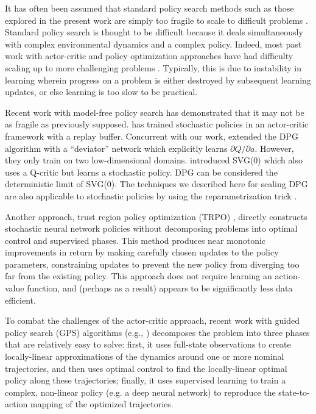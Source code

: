 \documentclass{article} %
\begin{document}
It has often been assumed that standard policy search methods such as
those explored in the present work are simply too fragile to scale to
difficult problems \citep{levine2015end}.  Standard policy search is
thought to be difficult because it deals simultaneously with complex
environmental dynamics and a complex policy.
Indeed,
most past work with actor-critic and policy optimization
approaches have had difficulty scaling up to more
challenging problems \citep{deisenroth2013survey}.
Typically, this is due to instability in
learning wherein progress on a problem is either destroyed by subsequent
learning updates, or else learning is too slow to be practical.

Recent work with model-free policy search has
demonstrated that it may not be as fragile as previously supposed.
\citet{wawrzynski2009real, wawrzynski2013autonomous} has
trained stochastic policies in an actor-critic framework
with a replay buffer.
Concurrent with our work, \citet{balduzzi2015compatible} extended the DPG
algorithm with a ``deviator'' network which explicitly learns
$\partial Q/\partial a$. However, they only train on two low-dimensional domains.
\citet{heess2015learning} introduced SVG(0) which also uses
a Q-critic but learns a stochastic policy.
DPG can be considered the deterministic limit of SVG(0). The techniques we
described here for scaling DPG are also applicable to stochastic policies by
using the reparametrization trick \citep{heessRDPG2015,schulman2015gradient}.

Another approach, trust region policy
optimization (TRPO) \citep{schulman2015trust}, directly constructs
stochastic neural network policies without decomposing problems into
optimal control and supervised phases.  This method produces near
monotonic improvements in return by making carefully chosen updates to
the policy parameters, constraining updates to prevent the new policy
from diverging too far from the existing policy.  This approach does
not require learning an action-value function, and (perhaps as a
result) appears to be significantly less data efficient.


To combat the challenges of the actor-critic approach, recent work
with guided policy search (GPS) algorithms (e.g.,
\citep{levine2015end}) decomposes the problem into three phases that are
relatively easy to solve: first, it uses full-state observations to
create locally-linear approximations of the dynamics around one or
more nominal trajectories, and then uses optimal control to find the
locally-linear optimal policy along these trajectories; finally, it uses
supervised learning to train a complex, non-linear policy (e.g. a deep
neural network) to reproduce the state-to-action mapping of the optimized
trajectories.
\end{document}

